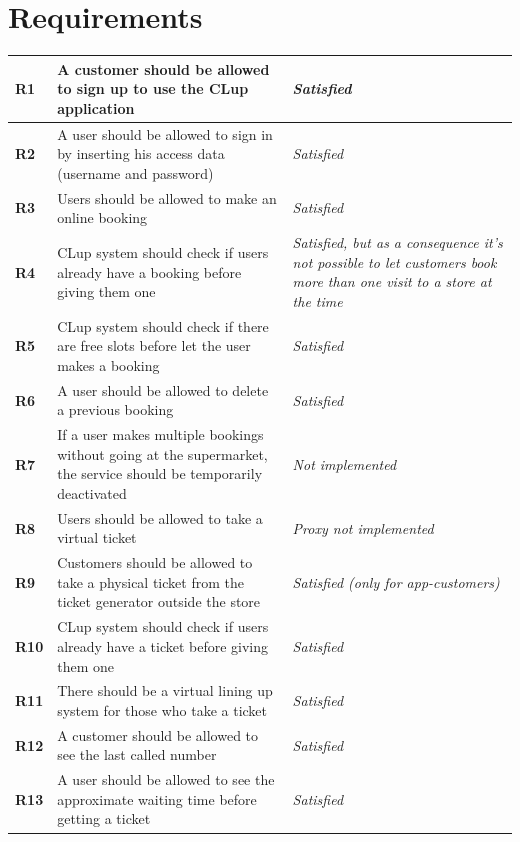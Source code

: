 \documentclass[a4paper,oneside,11pt]{book}
\begin{document}
    \section{Requirements}
    \begin{longtable}[c] { |>{\centering\arraybackslash}C{0.08\textwidth}|>{\arraybackslash}H{0.47\textwidth}|>{\centering\arraybackslash}H{0.23\textwidth}| }
        \hline
        \textbf{R1} & A customer should be allowed to sign up to use the CLup application & \textit{Satisfied} \\ \hline
        \textbf{R2} & A user should be allowed to sign in by inserting his access data (username and password) & \textit{Satisfied} \\ \hline
        \textbf{R3} & Users should be allowed to make an online booking & \textit{Satisfied} \\ \hline
        \textbf{R4} & CLup system should check if users already have a booking before giving them one & \textit{Satisfied, but as a consequence it’s not possible to let customers book more than one visit to a store at the time} \\ \hline
        \textbf{R5} & CLup system should check if there are free slots before let the user makes a booking & \textit{Satisfied} \\ \hline
        \textbf{R6} & A user should be allowed to delete a previous booking & \textit{Satisfied} \\ \hline
        \textbf{R7} & If a user makes multiple bookings without going at the supermarket, the service should be temporarily deactivated & \textit{Not implemented} \\ \hline
        \textbf{R8} & Users should be allowed to take a virtual ticket & \textit{Proxy not implemented} \\ \hline
        \textbf{R9} & Customers should be allowed to take a physical ticket from the ticket generator outside the store & \textit{Satisfied (only for app-customers)} \\ \hline
        \textbf{R10} & CLup system should check if users already have a ticket before giving them one & \textit{Satisfied} \\ \hline
        \textbf{R11} & There should be a virtual lining up system for those who take a ticket & \textit{Satisfied} \\ \hline
        \textbf{R12} & A customer should be allowed to see the last called number & \textit{Satisfied} \\ \hline
        \textbf{R13} & A user should be allowed to see the approximate waiting time before getting a ticket & \textit{Satisfied} \\ \hline

\end{longtable}
\end{document}
